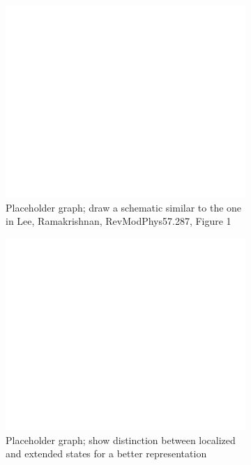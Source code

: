 \documentclass[10pt,a4paper]{article}
\begin{document}
\begin{figure}[H]
\centering
\begin{subfigure}{0.25\textwidth}
\includegraphics[width=\textwidth]{dummy.pdf}
\caption{Placeholder graph; draw a schematic similar to the one in Lee, Ramakrishnan, RevModPhys57.287, Figure 1}
\label{fig:b}
\end{subfigure}
\qquad
\begin{subfigure}{0.25\textwidth}
\includegraphics[width=\textwidth]{dummy.pdf}
\caption{Placeholder graph; show distinction between localized and extended states for a better representation}
\label{kondenzat}
\end{subfigure}
\caption{}
\end{figure}
\end{document}
